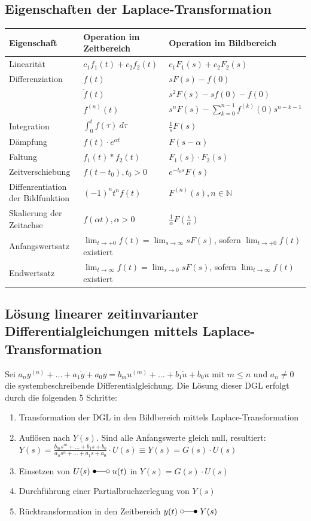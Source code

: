 \documentclass[10pt,a4paper]{article}
\begin{document}
\subsection{Eigenschaften der Laplace-Transformation}
\begin{tabularx}{\columnwidth}{|X|X|X|}
	\hline
	Eigenschaft & Operation im Zeitbereich & Operation im Bildbereich \\
	\hline
	\hline
	Linearität & $c_1f_1(t) + c_2f_2(t)$ & $c_1 F_1(s) + c_2 F_2(s)$ \\
	\hline
	Differenziation & $\dot f(t)$ & $sF(s) - f(0)$ \\
	& $\ddot f(t)$ & $s^2 F(s) - sf(0) - \dot f(0)$ \\
	& $f^{(n)}(t)$ & $s^n F(s) - \sum_{k=0}^{n-1} f^{(k)}(0) s^{n-k-1}$ \\
	\hline
	Integration & $\int_0^t f(\tau) ~d\tau$ & $\frac 1 s F(s)$ \\
	\hline
	Dämpfung & $f(t) ⋅ e^{\alpha t}$ & $F(s-\alpha)$ \\
	\hline
	Faltung & $f_1(t) * f_2(t)$ & $F_1(s) ⋅ F_2(s)$ \\
	\hline
	Zeitverschiebung & $f(t - t_0), t_0 > 0$ & $e^{-t_0 s}F(s)$ \\
	\hline
	Diffenrentiation der Bildfunktion & $(-1)^n t^n f(t)$ & $F^{(n)}(s), n \in \mathbb{N}$ \\
	\hline
	Skalierung der Zeitachse & $f(\alpha t), \alpha > 0$ & $\frac 1 \alpha F(\frac s \alpha)$ \\
	\hline
	Anfangswertsatz & \multicolumn{2}{X|}{$\lim_{t → +0} f(t) = \lim_{s → ∞} s F(s)$, sofern $\lim_{t → +0} f(t)$ existiert} \\
	\hline
	Endwertsatz & \multicolumn{2}{X|}{$\lim_{t → ∞} f(t) = \lim_{s → 0} sF(s)$, sofern $\lim_{t → ∞} f(t)$ existiert} \\
	\hline
\end{tabularx}

\subsection{Lösung linearer zeitinvarianter Differentialgleichungen mittels Laplace-Transformation}
Sei $a_ny^{(n)} + \dots + a_1 \dot y + a_0 y = b_m u^{(m)} + \dots + b_1 \dot u + b_0 u$ mit $m ≤ n$ und $a_n ≠ 0$ die systembeschreibende Differentialgleichung.
Die Lösung dieser DGL erfolgt durch die folgenden 5 Schritte:
\begin{enumerate}
	\item Transformation der DGL in den Bildbereich mittels Laplace-Transformation
	\item Auflösen nach $Y(s)$. Sind alle Anfangswerte gleich null, resultiert: \\
	$Y(s) = \frac{b_ms^m + \dots + b_1s + b_0}{a_ns^n + \dots + a_1s + a_0} ⋅ U(s) ≡ Y(s) = G(s) ⋅ U(s)$
	\item Einsetzen von $U(s) ~\Laplace ~u(t)$ in $Y(s) = G(s) ⋅ U(s)$
	\item Durchführung einer Partialbruchzerlegung von $Y(s)$
	\item Rücktransformation in den Zeitbereich $y(t) ~\laplace ~Y(s)$
\end{enumerate}
\end{document}
